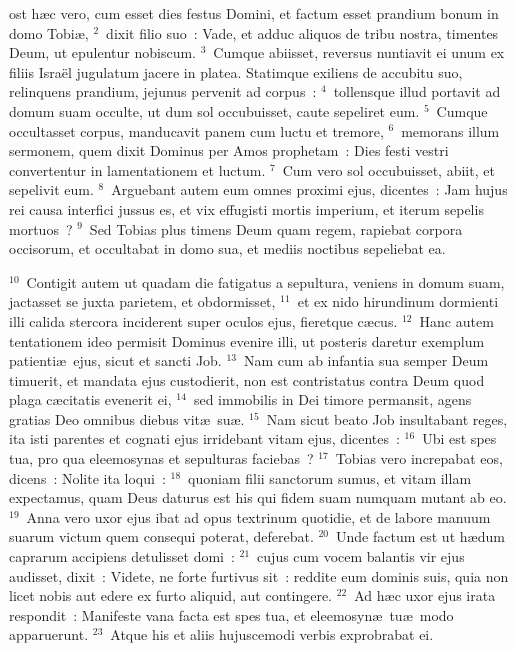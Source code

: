 \bchapter
{}ost h\ae c vero, cum esset dies festus Domini, et factum esset prandium bonum in domo Tobi\ae ,
${}^{2}$~dixit filio suo~: Vade, et adduc aliquos de tribu nostra, timentes Deum, ut epulentur nobiscum.
${}^{3}$~Cumque abiisset, reversus nuntiavit ei unum ex filiis Isra\"el jugulatum jacere in platea. Statimque exiliens de accubitu suo, relinquens prandium, jejunus pervenit ad corpus~:
${}^{4}$~tollensque illud portavit ad domum suam occulte, ut dum sol occubuisset, caute sepeliret eum.
${}^{5}$~Cumque occultasset corpus, manducavit panem cum luctu et tremore,
${}^{6}$~memorans illum sermonem, quem dixit Dominus per Amos prophetam~: Dies festi vestri convertentur in lamentationem et luctum.
${}^{7}$~Cum vero sol occubuisset, abiit, et sepelivit eum.
${}^{8}$~Arguebant autem eum omnes proximi ejus, dicentes~: Jam hujus rei causa interfici jussus es, et vix effugisti mortis imperium, et iterum sepelis mortuos~?
${}^{9}$~Sed Tobias plus timens Deum quam regem, rapiebat corpora occisorum, et occultabat in domo sua, et mediis noctibus sepeliebat ea.


${}^{10}$~Contigit autem ut quadam die fatigatus a sepultura, veniens in domum suam, jactasset se juxta parietem, et obdormisset,
${}^{11}$~et ex nido hirundinum dormienti illi calida stercora inciderent super oculos ejus, fieretque c\ae cus.
${}^{12}$~Hanc autem tentationem ideo permisit Dominus evenire illi, ut posteris daretur exemplum patienti\ae\ ejus, sicut et sancti Job.
${}^{13}$~Nam cum ab infantia sua semper Deum timuerit, et mandata ejus custodierit, non est contristatus contra Deum quod plaga c\ae citatis evenerit ei,
${}^{14}$~sed immobilis in Dei timore permansit, agens gratias Deo omnibus diebus vit\ae\ su\ae .
${}^{15}$~Nam sicut beato Job insultabant reges, ita isti parentes et cognati ejus irridebant vitam ejus, dicentes~:
${}^{16}$~Ubi est spes tua, pro qua eleemosynas et sepulturas faciebas~?
${}^{17}$~Tobias vero increpabat eos, dicens~: Nolite ita loqui~:
${}^{18}$~quoniam filii sanctorum sumus, et vitam illam expectamus, quam Deus daturus est his qui fidem suam numquam mutant ab eo.
${}^{19}$~Anna vero uxor ejus ibat ad opus textrinum quotidie, et de labore manuum suarum victum quem consequi poterat, deferebat.
${}^{20}$~Unde factum est ut h\ae dum caprarum accipiens detulisset domi~:
${}^{21}$~cujus cum vocem balantis vir ejus audisset, dixit~: Videte, ne forte furtivus sit~: reddite eum dominis suis, quia non licet nobis aut edere ex furto aliquid, aut contingere.
${}^{22}$~Ad h\ae c uxor ejus irata respondit~: Manifeste vana facta est spes tua, et eleemosyn\ae\ tu\ae\ modo apparuerunt.
${}^{23}$~Atque his et aliis hujuscemodi verbis exprobrabat ei.

